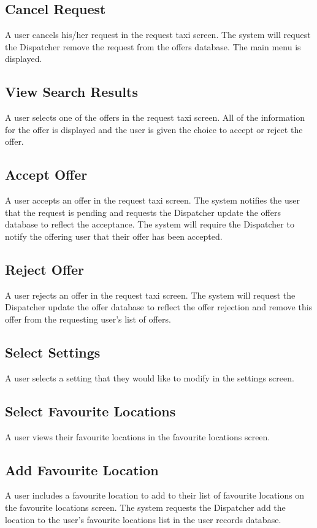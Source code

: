 \documentclass[english]{article}
\begin{document}
\subsection{Cancel Request}
A user cancels his/her request in the request taxi screen. The system will request the Dispatcher remove the request from the offers database. The main menu is displayed. 
\subsection{View Search Results}
A user selects one of the offers in the request taxi screen. All of the information for the offer is displayed and the user is given the choice to accept or reject the offer. 
\subsection{Accept Offer}
A user accepts an offer in the request taxi screen. The system notifies the user that the request is pending and requests the Dispatcher update the offers database to reflect the acceptance. The system will require the Dispatcher to notify the offering user that their offer has been accepted. 
\subsection{Reject Offer}
A user rejects an offer in the request taxi screen. The system will request the Dispatcher update the offer database to reflect the offer rejection and remove this offer from the requesting user's list of offers. 
\subsection{Select Settings}
A user selects a setting that they would like to modify in the settings screen.
\subsection{Select Favourite Locations}
A user views their favourite locations in the favourite locations screen.
\subsection{Add Favourite Location}
A user includes a favourite location to add to their list of favourite locations on the favourite locations screen. The system requests the Dispatcher add the location to the user's favourite locations list in the user records database. 
\end{document}
